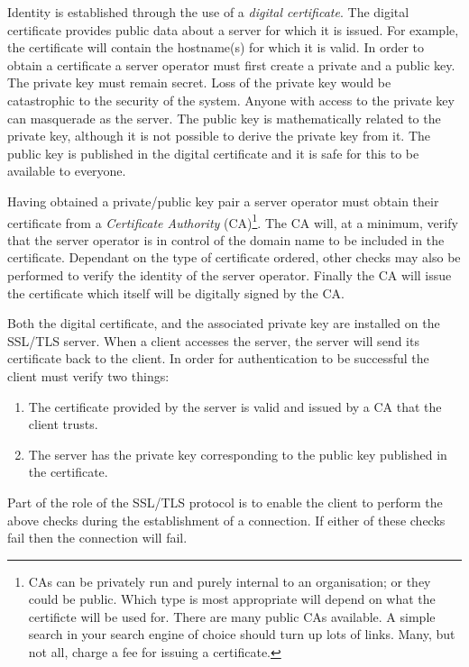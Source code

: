 Identity is established through the use of a \emph{digital certificate}. The 
digital certificate provides public data about a server for which it is issued. 
For example, the certificate will contain the hostname(s) for which it is 
valid. In order to obtain a certificate a server operator must first create a 
private and a public key. The private key must remain secret. Loss of the 
private key would be catastrophic to the security of the system. Anyone with 
access to the private key can masquerade as the server. The public key is 
mathematically related to the private key, although it is not possible to 
derive the private key from it. The public key is published in the digital 
certificate and it is safe for this to be available to everyone.

Having obtained a private/public key pair a server operator must obtain their
certificate from a \emph{Certificate Authority} (CA)\footnote{CAs can be
privately run and purely internal to an organisation; or they could be public.
Which type is most appropriate will depend on what the certificte will be used
for. There are many public CAs available. A simple search in your search engine
of choice should turn up lots of links. Many, but not all, charge a fee for
issuing a certificate.}. The CA will, at a minimum, verify that the server 
operator is in control of the domain name to be included in the certificate. 
Dependant on the type of certificate ordered, other checks may also be 
performed to verify the identity of the server operator. Finally the CA will 
issue the certificate which itself will be digitally signed by the CA.

Both the digital certificate, and the associated private key are installed on 
the SSL/TLS server. When a client accesses the server, the server will send 
its certificate back to the client. In order for authentication to be
successful the client must verify two things:
\begin{enumerate}
\item The certificate provided by the server is valid and issued by a CA that 
the client trusts.
\item The server has the private key corresponding to the public key published 
in the certificate.
\end{enumerate}

Part of the role of the SSL/TLS protocol is to enable the client to perform the 
above checks during the establishment of a connection. If either of these 
checks fail then the connection will fail.


